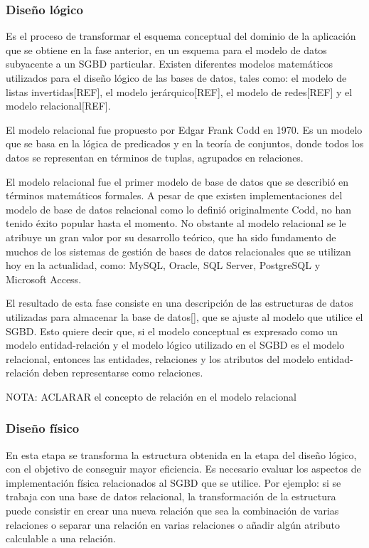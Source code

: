 \subsubsection{Diseño lógico}
Es el proceso de transformar el esquema conceptual del dominio de la aplicación
que se obtiene en la fase anterior,
en un esquema para el modelo de datos subyacente a un SGBD particular.
Existen diferentes modelos matemáticos utilizados para el diseño lógico
de las bases de datos, tales como: el modelo de listas invertidas[REF], el modelo 
jerárquico[REF], el modelo de redes[REF] y el modelo relacional[REF]. 

El modelo relacional fue propuesto por Edgar Frank Codd en 1970. Es un 
modelo que se basa en la lógica de predicados y en la teoría 
de conjuntos, donde todos los datos se representan en términos de tuplas, 
agrupados en relaciones.

El modelo relacional fue el primer modelo de base de datos que se describió en términos 
matemáticos formales. A pesar de que existen  
implementaciones del modelo de base de datos relacional como lo definió originalmente 
Codd, no han tenido éxito popular hasta el momento. No obstante al modelo relacional se le 
atribuye un gran valor por su desarrollo teórico, que ha sido fundamento de muchos de los 
sistemas de gestión de bases de datos relacionales que se utilizan hoy en la actualidad, como:
MySQL, Oracle, SQL Server, PostgreSQL y Microsoft Access. 

El resultado de esta fase consiste en una descripción de las estructuras 
de datos utilizadas para almacenar la base de datos[\cite{db_book_cap3}], que se 
ajuste al modelo que utilice el SGBD. Esto quiere decir que,
si el modelo conceptual es expresado como un modelo 
entidad-relación y el modelo lógico utilizado en el SGBD es el modelo 
relacional, entonces las entidades, relaciones y los atributos del modelo entidad-relación
deben representarse como relaciones. 

NOTA: ACLARAR el concepto de relación en el modelo relacional



\subsubsection{Diseño físico}
En esta etapa se transforma la estructura obtenida en la etapa del diseño
lógico, con el objetivo de conseguir mayor eficiencia. Es necesario
evaluar los aspectos de implementación física relacionados al SGBD que se utilice.
Por ejemplo: si se trabaja con una base de datos relacional, la 
transformación de la estructura puede consistir en crear una nueva relación que 
sea la combinación de varias relaciones o separar una relación en varias relaciones o 
añadir algún atributo calculable a una relación. \\




